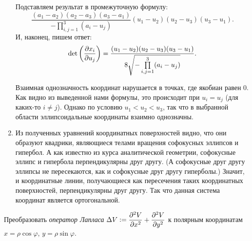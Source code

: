 \begin{solution}
\begin{enumerate}[nolistsep, label=(\arabic*)]
			Подставляем результат в промежуточную формулу:
			\[
				\frac{(a_1 - a_2)(a_2 - a_3)(a_3 - a_1)}{-\prod\limits_{i, j = 1}^3(a_i - u_j)}(u_1 - u_2)(u_2 - u_3)(u_3 - u_1).
			\]
			И, наконец, пишем ответ:
			\[
				\det\left(\frac{\partial x_i}{\partial u_j}\right) =
				\frac{(u_1 - u_2)(u_2 - u_3)(u_3 - u_1)}{8\sqrt{-\prod\limits_{i, j = 1}^3(a_i - u_j)}}.
			\]

			Взаимная однозначность координат нарушается в точках, где якобиан равен $0$. Как видно из выведенной нами формулы, это происходит при $u_i = u_j$ (для каких-то $i \ne j$). Однако по условию $u_1 < u_2 < u_3$, так что в выбранной области эллипсоидальные координаты взаимно однозначны.
		\item Из полученных уравнений координатных поверхностей видно, что они образуют квадрики, являющиеся телами вращения софокусных эллипсов и гипербол. А как известно из курса аналитической геометрии, софокусные эллипс и гипербола перпендикулярны друг другу. (А софокусные друг другу эллипсы не пересекаются, как и софокусные друг другу гиперболы.) Значит, и координатные линии, получающиеся как пересечения таких координатных поверхностей, перпендикулярны друг другу. Так что данная система координат является ортогональной.
	\end{enumerate}
\end{solution}

\begin{problem}
	Преобразовать \textit{оператор Лапласа} $\Delta V \vcentcolon = \displaystyle\frac{\partial^2V}{\partial x^2} + \frac{\partial^2V}{\partial y^2}$ к полярным координатам $x = \rho\cos\varphi$, $y = \rho\sin\varphi$.
\end{problem}

